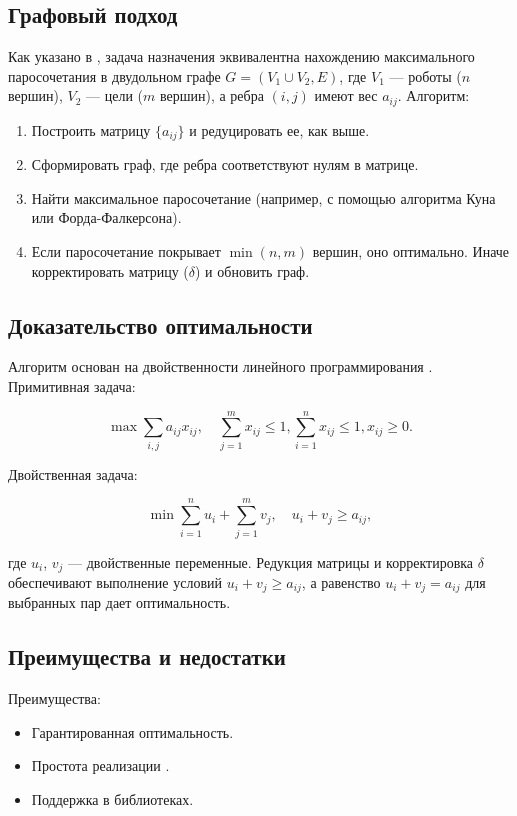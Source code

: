 \subsection{Графовый подход}
Как указано в \cite{emaxx2025}, задача назначения эквивалентна нахождению максимального паросочетания в двудольном графе \( G = (V_1 \cup V_2, E) \), где \( V_1 \) --- роботы (\( n \) вершин), \( V_2 \) --- цели (\( m \) вершин), а ребра \( (i,j) \) имеют вес \( a_{ij} \). Алгоритм:

\begin{enumerate}
    \item Построить матрицу \( \{a_{ij}\} \) и редуцировать ее, как выше.
    \item Сформировать граф, где ребра соответствуют нулям в матрице.
    \item Найти максимальное паросочетание (например, с помощью алгоритма Куна или Форда-Фалкерсона).
    \item Если паросочетание покрывает \( \min(n, m) \) вершин, оно оптимально. Иначе корректировать матрицу (\( \delta \)) и обновить граф.
\end{enumerate}

\subsection{Доказательство оптимальности}
Алгоритм основан на двойственности линейного программирования \cite{kuhn1955}. Примитивная задача:

\[
\max \sum_{i,j} a_{ij} x_{ij}, \quad \sum_{j=1}^m x_{ij} \leq 1, \sum_{i=1}^n x_{ij} \leq 1, x_{ij} \geq 0.
\]

Двойственная задача:

\[
\min \sum_{i=1}^n u_i + \sum_{j=1}^m v_j, \quad u_i + v_j \geq a_{ij},
\]

где \( u_i \), \( v_j \) --- двойственные переменные. Редукция матрицы и корректировка \( \delta \) обеспечивают выполнение условий \( u_i + v_j \geq a_{ij} \), а равенство \( u_i + v_j = a_{ij} \) для выбранных пар дает оптимальность.

\subsection{Преимущества и недостатки}
Преимущества:
\begin{itemize}
    \item Гарантированная оптимальность.
    \item Простота реализации \cite{emaxx2025}.
    \item Поддержка в библиотеках.
\end{itemize}

